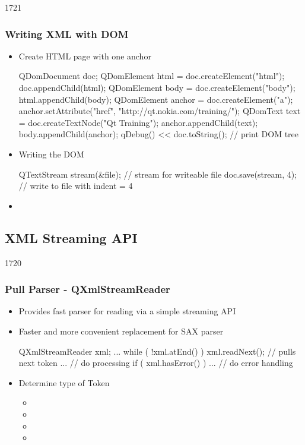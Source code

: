 \begin{slide}[fragile]{1721}\frametitle{Writing XML with DOM}
\begin{itemize}
\item Create HTML page with one anchor
  \begin{cpp}
QDomDocument doc;
QDomElement html = doc.createElement("html");
doc.appendChild(html);
QDomElement body = doc.createElement("body");
html.appendChild(body);
QDomElement anchor = doc.createElement("a");
anchor.setAttribute("href", "http://qt.nokia.com/training/");
QDomText text = doc.createTextNode("Qt Training");
anchor.appendChild(text);
body.appendChild(anchor);
qDebug() << doc.toString(); // print DOM tree
  \end{cpp}
\item Writing the DOM
  \begin{cpp}
QTextStream stream(&file); // stream for writeable file
doc.save(stream, 4); // write to file with indent = 4    
  \end{cpp}
 \item {}
  \end{itemize}
\end{slide}

\subsection{XML Streaming API}
\begin{slide}[fragile]{1720}\frametitle{Pull Parser - QXmlStreamReader} \label{QXmlStreamReader}
\begin{itemize}
\item Provides fast parser for reading via a simple streaming API
\item Faster and more convenient replacement for SAX parser
  \begin{cpp}
QXmlStreamReader xml;
...
while ( !xml.atEnd() ) {
  xml.readNext(); // pulls next token
  ... // do processing
}
if ( xml.hasError() ) {
  ... // do error handling
}    
  \end{cpp}
\item Determine type of Token
  \begin{itemize}
  \item {}
  \item {}
  \item {}
  \item {}
 \end{itemize}
\end{itemize}
\end{slide}

